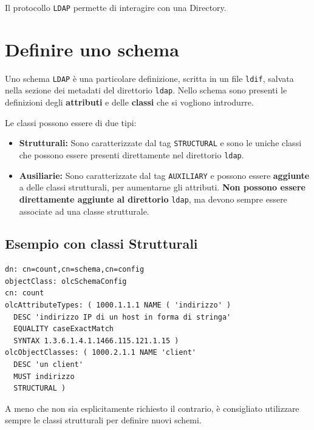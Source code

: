 \documentclass[a4paper]{report}
\newenvironment{info}{\begin{tcolorbox}[fonttitle=\sffamily\bfseries\large,title=Info,colframe=blue!75!white]}{\end{tcolorbox}}
\newenvironment{code}{\begin{tcolorbox}[size=small]}{\end{tcolorbox}}
\begin{document}
Il protocollo \texttt{LDAP} permette di interagire con una Directory.

\section{Definire uno schema}
\label{sec:schema}

Uno schema \texttt{LDAP} è una particolare definizione, scritta in un file \texttt{ldif}, salvata nella sezione dei metadati del direttorio \texttt{ldap}. 
Nello schema sono presenti le definizioni degli \textbf{attributi} e delle \textbf{classi} che si vogliono introdurre.

Le classi possono essere di due tipi:

\begin{itemize}
\item \textbf{Strutturali: } Sono caratterizzate dal tag \texttt{STRUCTURAL} e sono le uniche classi che possono essere presenti direttamente nel direttorio \texttt{ldap}.
\item \textbf{Ausiliarie: } Sono caratterizzate dal tag \texttt{AUXILIARY} e possono essere \textbf{aggiunte} a delle classi strutturali, per aumentarne gli attributi. \textbf{Non possono essere direttamente aggiunte al direttorio} \texttt{ldap}, ma devono sempre essere associate ad una classe strutturale.

\end{itemize}

\subsection{Esempio con classi Strutturali}

\begin{code}
\begin{lstlisting}
dn: cn=count,cn=schema,cn=config
objectClass: olcSchemaConfig
cn: count
olcAttributeTypes: ( 1000.1.1.1 NAME ( 'indirizzo' )
  DESC 'indirizzo IP di un host in forma di stringa'
  EQUALITY caseExactMatch
  SYNTAX 1.3.6.1.4.1.1466.115.121.1.15 )
olcObjectClasses: ( 1000.2.1.1 NAME 'client'
  DESC 'un client'
  MUST indirizzo
  STRUCTURAL )
\end{lstlisting}
\end{code}

\begin{info}
A meno che non sia esplicitamente richiesto il contrario, è consigliato utilizzare sempre le classi strutturali per definire nuovi schemi.
\end{info}
\end{document}
